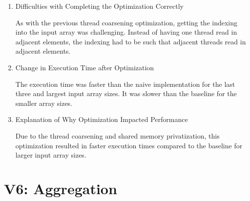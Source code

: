 \documentclass{article}
\begin{document}
\begin{enumerate}
	\item Difficulties with Completing the Optimization Correctly
	
	As with the previous thread coarsening optimization, getting the indexing into the input array was challenging. Instead of having one thread read in adjacent elements, the indexing had to be such that adjacent threads read in adjacent elements. 
	
	\item Change in Execution Time after Optimization
	
	The execution time was faster than the naive implementation for the last three and largest input array sizes. It was slower than the baseline for the smaller array sizes. 
	
	\item Explanation of Why Optimization Impacted Performance
	
	Due to the thread coarsening and shared memory privatization, this optimization resulted in faster execution times compared to the baseline for larger input array sizes. 
	
\end{enumerate}

\section{V6: Aggregation}
\end{document}
